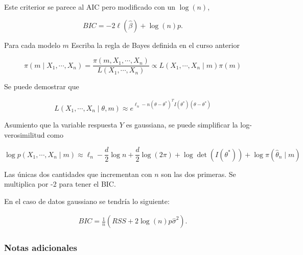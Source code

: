 \documentclass[
  12pt,
]{book}
\theoremstyle{definition}
\theoremstyle{definition}
\theoremstyle{definition}
\theoremstyle{definition}
\theoremstyle{remark}
\begin{document}
Este criterior se parece al AIC pero modificado con un \(\log(n)\),

\[
BIC = -2\ell(\hat{\beta}) + \log(n)p. 
\]

Para cada modelo \(m\) Escriba la regla de Bayes definida en el curso anterior

\begin{equation*}
\pi\left(m \mid X_{1}, \cdots, X_{n}\right)=\frac{\pi\left(m, X_{1}, \cdots, X_{n}\right)}{L\left(X_{1}, \cdots, X_{n}\right)} \propto L\left(X_{1}, \cdots, X_{n} \mid m\right) \pi(m)
\end{equation*}

Se puede demostrar que

\begin{equation*}
L\left(X_{1}, \cdots, X_{n} \mid \theta, m\right) \approx e^{\ell_{n}-n\left(\theta-\theta^{*}\right)^{T} I\left(\theta^{*}\right)\left(\theta-\theta^{*}\right)}
\end{equation*}

Asumiento que la variable respuesta \(Y\) es gaussiana, se puede simplificar la log-verosimilitud como

\begin{equation*}
\log p\left(X_{1}, \cdots, X_{n} \mid m\right) \approx \ell_{n}-\frac{d}{2} \log n+\frac{d}{2} \log (2 \pi)+\log \operatorname{det}\left(I\left(\theta^{*}\right)\right)+\log \pi\left(\hat{\theta}_{n} \mid m\right)
\end{equation*}

Las únicas dos cantidades que incrementan con \(n\) son las dos primeras. Se multiplica por -2 para tener el BIC.

En el caso de datos gaussiano se tendría lo siguiente:

\begin{align*}
BIC = \frac{1}{n}(RSS+2\log (n)p\hat \sigma^2).
\end{align*}

\hypertarget{notas-adicionales}{%
\subsubsection{Notas adicionales}\label{notas-adicionales}}
\end{document}
